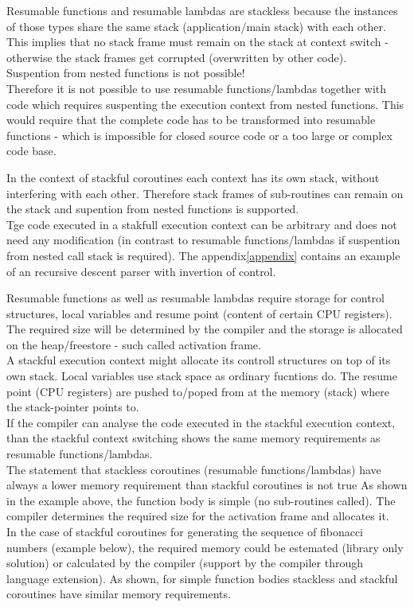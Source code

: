 Resumable functions and resumable lambdas are stackless because the instances of
those types share the same stack (application/main stack) with each other.\\
This implies that no stack frame must remain on the stack at context switch -
otherwise the stack frames get corrupted (overwritten by other code).\\
Suspention from nested functions is not possible!\\
Therefore it is not possible to use resumable functions/lambdas together with
code which requires suspenting the execution context from nested functions.
This would require that the complete code has to be transformed into resumable
functions - which is impossible for closed source code or a too large or complex
code base.

In the context of stackful coroutines each context has its own stack,
without interfering with each other. Therefore stack frames of sub-routines can
remain on the stack and supention from nested functions is supported.\\
Tge code executed in a stakfull execution context can be arbitrary and does not
need any modification (in contrast to resumable functions/lambdas if suspention
from nested call stack is required). The appendix\ref{appendix} contains an
example of an recursive descent parser with invertion of control.

Resumable functions as well as resumable lambdas require storage for control
structures, local variables and resume point (content of certain CPU registers).
The required size will be determined by the compiler and the storage is
allocated on the heap/freestore - such called activation frame.\\
A stackful execution context might allocate its controll structures on top of
its own stack. Local variables use stack space as ordinary fucntions do.
The resume point (CPU registers) are pushed to/poped from at the memory (stack)
where the stack-pointer points to.\\
If the compiler can analyse the code executed in the stackful execution context,
than the stackful context switching shows the same memory requirements as
resumable functions/lambdas.\\
\newline
The statement that stackless coroutines (resumable functions/lambdas) have
always a lower memory requirement than stackful coroutines is not true
As shown in the example above, the function body is simple (no sub-routines
called). The compiler determines the required size for the activation frame and
allocates it.\\
In the case of stackful coroutines for generating the sequence of fibonacci
numbers (example below), the required memory could be estemated (library only
solution) or calculated by the compiler (support by the compiler through
language extension).
As shown, for simple function bodies stackless and stackful coroutines have
similar memory requirements.\\

